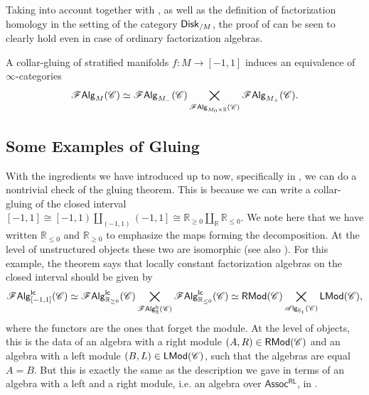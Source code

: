 \documentclass[../text]{subfiles}
\begin{document}
Taking into account  together with , as well as the definition of factorization homology in the setting of the category $\disk[r]_{/M}$, the proof of  can be seen to clearly hold even in case of ordinary factorization algebras.

\begin{corollary}\label{cor:gluing_falgs}
    A collar-gluing of stratified manifolds $f: M \rightarrow [-1,1]$ induces an equivalence of $\infty$-categories
    \begin{equation}
        \mathscr{F} \mathsf{Alg}_M (\mathscr{C}) \simeq \mathscr{F} \mathsf{Alg}_{M_-} (\mathscr{C}) \bigtimes_{\mathscr{F} \mathsf{Alg}_{M_0 \times \mathbb{R}} (\mathscr{C})} \mathscr{F} \mathsf{Alg}_{M_+}(\mathscr{C}).
    \end{equation}
\end{corollary}


\subsection{Some Examples of Gluing}


\begin{example}\label{ex:reproduce_lcfas_on_interval}
    With the ingredients we have introduced up to now, specifically in , we can do a nontrivial check of the gluing theorem. This is because we can write a collar-gluing of the closed interval $[-1,1] \cong \left[-1,1\right) \coprod_{(-1,1)} \left(-1,1\right] \cong \mathbb{R}_{\geq 0} \coprod_{\mathbb{R}} \mathbb{R}_{\leq 0}$. We note here that we have written $\mathbb{R}_{\leq 0}$ and $\mathbb{R}_{\geq 0}$ to emphasize the maps forming the decomposition. At the level of unstructured objects these two are isomorphic (see also ). For this example, the theorem says that locally constant factorization algebras on the closed interval should be given by
    \begin{equation}
        \mathscr{F} \mathsf{Alg}^{\mathsf{lc}}_{[-1,1]} (\mathscr{C}) \simeq \mathscr{F} \mathsf{Alg}^{\mathsf{lc}}_{\mathbb{R}_{\geq 0}} (\mathscr{C}) \bigtimes_{\mathscr{F} \mathsf{Alg}^{\mathsf{lc}}_{\mathbb{R}} (\mathscr{C})} \mathscr{F} \mathsf{Alg}^{\mathsf{lc}}_{\mathbb{R}_{\leq 0}} (\mathscr{C}) \simeq \mathsf{RMod} (\mathscr{C}) \bigtimes_{\mathscr{A} \mathsf{lg}_{\mathbb{E}_1} (\mathscr{C})} \mathsf{LMod} (\mathscr{C}),
    \end{equation}
    where the functors are the ones that forget the module. At the level of objects, this is the data of an algebra with a right module $(A, R) \in \mathsf{RMod} (\mathscr{C})$ and an algebra with a left module $(B, L) \in \mathsf{LMod} (\mathscr{C})$, such that the algebras are equal $A = B$. But this is exactly the same as the description we gave in terms of an algebra with a left and a right module, i.e. an algebra over $\mathsf{Assoc^{RL}}$, in .
\end{example}
\end{document}
